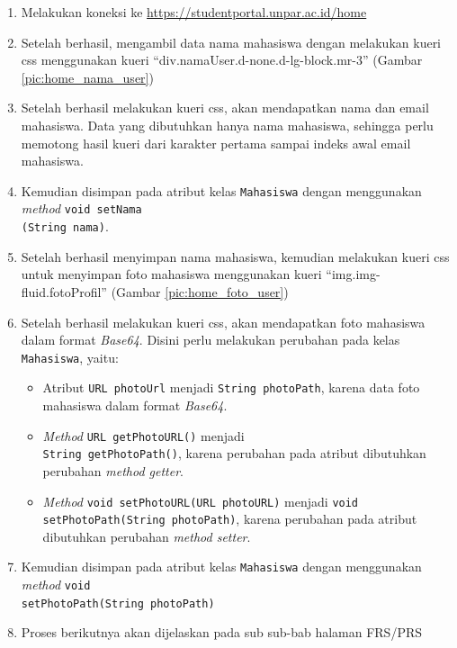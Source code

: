 \begin{enumerate}
	\item Melakukan koneksi ke \url{https://studentportal.unpar.ac.id/home}
	\item Setelah berhasil, mengambil data nama mahasiswa dengan melakukan kueri css menggunakan kueri ``div.namaUser.d-none.d-lg-block.mr-3'' (Gambar \ref{pic:home_nama_user})
	\item Setelah berhasil melakukan kueri css, akan mendapatkan nama dan email mahasiswa. Data yang dibutuhkan hanya nama mahasiswa, sehingga perlu memotong hasil kueri dari karakter pertama sampai indeks awal email mahasiswa. 
	\item Kemudian disimpan pada atribut kelas \texttt{Mahasiswa} dengan menggunakan \textit{method} \texttt{void setNama\\(String nama)}.
	\item Setelah berhasil menyimpan nama mahasiswa, kemudian melakukan kueri css untuk menyimpan foto mahasiswa menggunakan kueri ``img.img-fluid.fotoProfil'' (Gambar \ref{pic:home_foto_user})
	\item Setelah berhasil melakukan kueri css, akan mendapatkan foto mahasiswa dalam format \textit{Base64}. Disini perlu melakukan perubahan pada kelas \texttt{Mahasiswa}, yaitu:
	\begin{itemize}
		\item Atribut \texttt{URL photoUrl} menjadi \texttt{String photoPath}, karena data foto mahasiswa dalam format \textit{Base64}.
		\item \textit{Method} \texttt{URL getPhotoURL()} menjadi \\\texttt{String getPhotoPath()}, karena perubahan pada atribut dibutuhkan perubahan \textit{method getter}.
		\item \textit{Method} \texttt{void setPhotoURL(URL photoURL)} menjadi \texttt{void \\setPhotoPath(String photoPath)}, karena perubahan pada atribut dibutuhkan perubahan \textit{method setter}.
	\end{itemize}
	\item Kemudian disimpan pada atribut kelas \texttt{Mahasiswa} dengan menggunakan \textit{method} \texttt{void \\setPhotoPath(String photoPath)}
	\item Proses berikutnya akan dijelaskan pada sub sub-bab halaman FRS/PRS
\end{enumerate}


